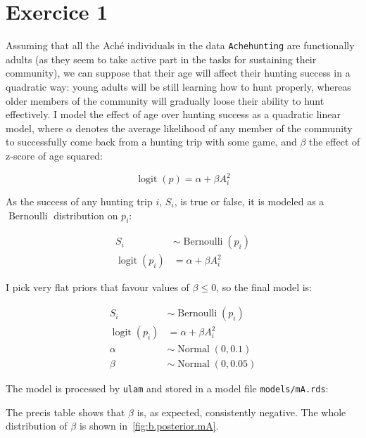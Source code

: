 \documentclass[article, a4paper, 12pt]{memoir}
\DeclareMathOperator{\logit}{logit}
\DeclareMathOperator{\normal}{Normal}
\DeclareMathOperator{\bernoulli}{Bernoulli}
\begin{document}
\chapter*{Exercice 1}

Assuming that all the Aché individuals in the data \texttt{Achehunting} are functionally adults (as they seem to take active part in the tasks for sustaining their community), we can suppose that their age will affect their hunting success in a quadratic way:
young adults will be still learning how to hunt properly, whereas older members of the community will gradually loose their ability to hunt effectively.
I model the effect of age over hunting success as a quadratic linear model, where $\alpha$ denotes the average likelihood of any member of the community to successfully come back from a hunting trip with some game, and $\beta$ the effect of z\hyp{}score of age squared:

\begin{equation*}
    \logit(p) = \alpha + \beta A_i^2
\end{equation*}

As the success of any hunting trip $i$, $S_i$, is true or false, it is modeled as a $\bernoulli$ distribution on $p_i$:

\begin{align*}
    S_i& \sim \bernoulli(p_i)\\
    \logit(p_i)& = \alpha + \beta A_i^2
\end{align*}

I pick very flat priors that favour values of $\beta \leq 0$, so the final model is:

\begin{align*}
    S_i& \sim \bernoulli(p_i)\\
    \logit(p_i)& = \alpha + \beta A_i^2\\
    \alpha& \sim \normal(0,0.1)\\
    \beta& \sim \normal(0, 0.05)
\end{align*}

The model is processed by \texttt{ulam} and stored in a model file \texttt{models/mA.rds}:



The precis table shows that $\beta$ is, as expected, consistently negative.
The whole distribution of $\beta$ is shown in~\autoref{fig:b.posterior.mA}.


\end{document}
